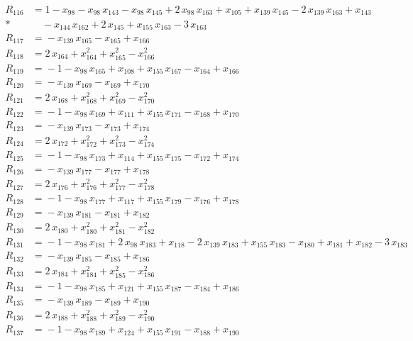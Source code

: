 \begin{align*}
R_{116} &={} 1 -x_{98} -x_{98}\,x_{143} -x_{98}\,x_{145} +2\,x_{98}\,x_{163} +x_{105} +x_{139}\,x_{145} -2\,x_{139}\,x_{163} +x_{143} \\*
&\quad{} -x_{144}\,x_{162} +2\,x_{145} +x_{155}\,x_{163} -3\,x_{163} \\[3pt]
R_{117} &={} -x_{139}\,x_{165} -x_{165} +x_{166} \\[3pt]
R_{118} &={} 2\,x_{164} +x_{164}^{2} +x_{165}^{2} -x_{166}^{2} \\[3pt]
R_{119} &={} -1 -x_{98}\,x_{165} +x_{108} +x_{155}\,x_{167} -x_{164} +x_{166} \\[3pt]
R_{120} &={} -x_{139}\,x_{169} -x_{169} +x_{170} \\[3pt]
R_{121} &={} 2\,x_{168} +x_{168}^{2} +x_{169}^{2} -x_{170}^{2} \\[3pt]
R_{122} &={} -1 -x_{98}\,x_{169} +x_{111} +x_{155}\,x_{171} -x_{168} +x_{170} \\[3pt]
R_{123} &={} -x_{139}\,x_{173} -x_{173} +x_{174} \\[3pt]
R_{124} &={} 2\,x_{172} +x_{172}^{2} +x_{173}^{2} -x_{174}^{2} \\[3pt]
R_{125} &={} -1 -x_{98}\,x_{173} +x_{114} +x_{155}\,x_{175} -x_{172} +x_{174} \\[3pt]
R_{126} &={} -x_{139}\,x_{177} -x_{177} +x_{178} \\[3pt]
R_{127} &={} 2\,x_{176} +x_{176}^{2} +x_{177}^{2} -x_{178}^{2} \\[3pt]
R_{128} &={} -1 -x_{98}\,x_{177} +x_{117} +x_{155}\,x_{179} -x_{176} +x_{178} \\[3pt]
R_{129} &={} -x_{139}\,x_{181} -x_{181} +x_{182} \\[3pt]
R_{130} &={} 2\,x_{180} +x_{180}^{2} +x_{181}^{2} -x_{182}^{2} \\[3pt]
R_{131} &={} -1 -x_{98}\,x_{181} +2\,x_{98}\,x_{183} +x_{118} -2\,x_{139}\,x_{183} +x_{155}\,x_{183} -x_{180} +x_{181} +x_{182} -3\,x_{183} \\[3pt]
R_{132} &={} -x_{139}\,x_{185} -x_{185} +x_{186} \\[3pt]
R_{133} &={} 2\,x_{184} +x_{184}^{2} +x_{185}^{2} -x_{186}^{2} \\[3pt]
R_{134} &={} -1 -x_{98}\,x_{185} +x_{121} +x_{155}\,x_{187} -x_{184} +x_{186} \\[3pt]
R_{135} &={} -x_{139}\,x_{189} -x_{189} +x_{190} \\[3pt]
R_{136} &={} 2\,x_{188} +x_{188}^{2} +x_{189}^{2} -x_{190}^{2} \\[3pt]
R_{137} &={} -1 -x_{98}\,x_{189} +x_{124} +x_{155}\,x_{191} -x_{188} +x_{190} \\[3pt]

\end{align*}
